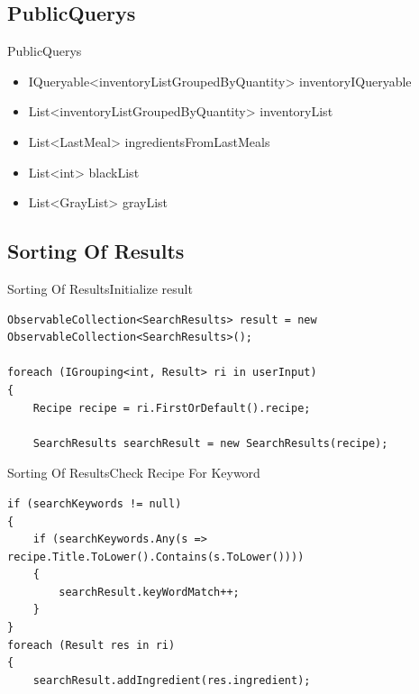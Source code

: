 \subsection{PublicQuerys}
\begin{frame}{PublicQuerys}
    \begin{itemize}
        \item IQueryable<inventoryListGroupedByQuantity> inventoryIQueryable
        \item List<inventoryListGroupedByQuantity> inventoryList
        \item List<LastMeal> ingredientsFromLastMeals
        \item List<int> blackList
        \item List<GrayList> grayList
    \end{itemize}
\end{frame}


\subsection{Sorting Of Results}
\begin{frame}[fragile]{Sorting Of Results}{Initialize result}
\begin{lstlisting}
ObservableCollection<SearchResults> result = new ObservableCollection<SearchResults>();

foreach (IGrouping<int, Result> ri in userInput)
{
    Recipe recipe = ri.FirstOrDefault().recipe;

    SearchResults searchResult = new SearchResults(recipe);
\end{lstlisting}
\end{frame}

\begin{frame}[fragile]{Sorting Of Results}{Check Recipe For Keyword}
\begin{lstlisting}
if (searchKeywords != null)
{
    if (searchKeywords.Any(s => recipe.Title.ToLower().Contains(s.ToLower())))
    {
        searchResult.keyWordMatch++;
    }
}
foreach (Result res in ri)
{
    searchResult.addIngredient(res.ingredient);
\end{lstlisting}
\end{frame}


